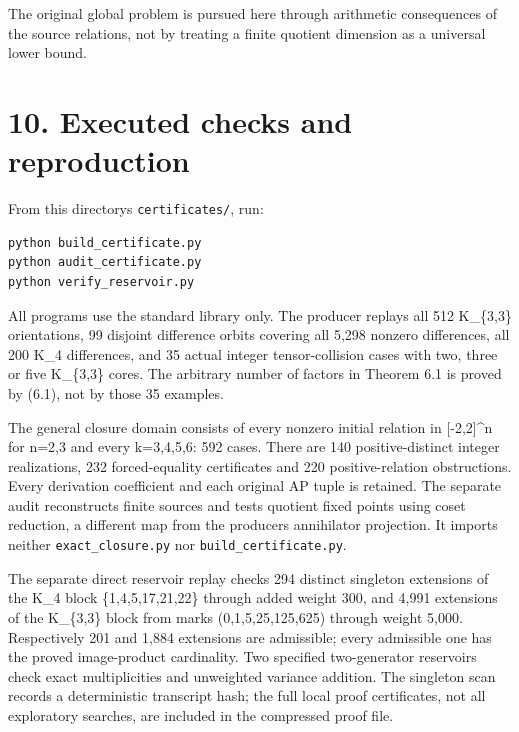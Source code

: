 The original global problem is pursued here through arithmetic consequences of the source relations, not by treating a finite quotient dimension as a universal lower bound.

\section{10. Executed checks and reproduction}\label{n16-executed-checks-and-reproduction}

From this directory\textquotesingle s \texttt{certificates/}, run:

\begin{Verbatim}[breaklines=true,breakanywhere=true,fontsize=\footnotesize]
python build_certificate.py
python audit_certificate.py
python verify_reservoir.py
\end{Verbatim}

All programs use the standard library only. The producer replays all 512 K\_\{3,3\} orientations, 99 disjoint difference orbits covering all 5,298 nonzero differences, all 200 K\_4 differences, and 35 actual integer tensor-collision cases with two, three or five K\_\{3,3\} cores. The arbitrary number of factors in Theorem 6.1 is proved by (6.1), not by those 35 examples.

The general closure domain consists of every nonzero initial relation in {[}-2,2{]}\^{}n for n=2,3 and every k=3,4,5,6: 592 cases. There are 140 positive-distinct integer realizations, 232 forced-equality certificates and 220 positive-relation obstructions. Every derivation coefficient and each original AP tuple is retained. The separate audit reconstructs finite sources and tests quotient fixed points using coset reduction, a different map from the producer\textquotesingle s annihilator projection. It imports neither \texttt{exact\_closure.py} nor \texttt{build\_certificate.py}.

The separate direct reservoir replay checks 294 distinct singleton extensions of the K\_4 block \{1,4,5,17,21,22\} through added weight 300, and 4,991 extensions of the K\_\{3,3\} block from marks (0,1,5,25,125,625) through weight 5,000. Respectively 201 and 1,884 extensions are admissible; every admissible one has the proved image-product cardinality. Two specified two-generator reservoirs check exact multiplicities and unweighted variance addition. The singleton scan records a deterministic transcript hash; the full local proof certificates, not all exploratory searches, are included in the compressed proof file.

